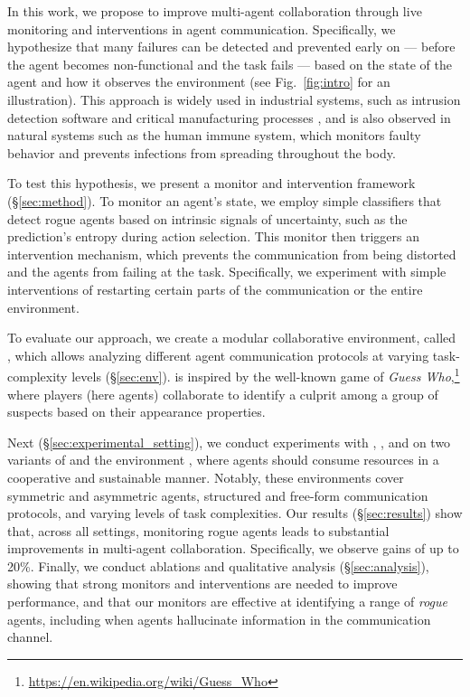 In this work, we propose to improve multi-agent collaboration through live monitoring and interventions in agent communication. Specifically, we hypothesize that many failures can be detected and prevented early on --- before the agent becomes non-functional and the task fails --- based on the state of the agent and how it observes the environment (see Fig.~\ref{fig:intro} for an illustration). 
This approach is widely used in industrial systems, such as intrusion detection software and critical manufacturing processes \cite{STAVROPOULOS2013421, 10.1145/3411763.3451774, manpaper, Woods02092023, cyber}, and is also observed in natural systems such as the human immune system, which monitors faulty behavior and prevents infections from spreading throughout the body. 


To test this hypothesis, we present a monitor and intervention framework (\S\ref{sec:method}). To monitor an agent's state, we employ simple classifiers that detect rogue agents based on intrinsic signals of uncertainty, such as the prediction's entropy during action selection. This monitor then triggers an intervention mechanism, which prevents the communication from being distorted and the agents from failing at the task. 
Specifically, we experiment with simple interventions of restarting certain parts of the communication or the entire environment.

To evaluate our approach, we create a modular collaborative environment, called \ourenv{}, which allows analyzing different agent communication protocols at varying task-complexity levels (\S\ref{sec:env}). \ourenv{} is inspired by the well-known game of \emph{Guess Who},\footnote{\url{https://en.wikipedia.org/wiki/Guess_Who}} where players (here agents) collaborate to identify a culprit among a group of suspects based on their appearance properties.

Next (\S\ref{sec:experimental_setting}), we conduct experiments with \llama{} \cite{grattafiori2024llama3herdmodels}, \qwen{} \cite{qwen2025qwen25technicalreport}, and \gpt{} \cite{openai2024gpt4technicalreport} on two variants of \ourenv{} and the \govsim{} environment \cite{piatti2024cooperate}, where agents should consume resources in a cooperative and sustainable manner. Notably, these environments cover symmetric and asymmetric agents, structured and free-form communication protocols, and varying levels of task complexities.
Our results (\S\ref{sec:results}) show that, across all settings, monitoring rogue agents leads to substantial improvements in multi-agent collaboration. Specifically, we observe gains of up to 20\%.
Finally, we conduct ablations and qualitative analysis (\S\ref{sec:analysis}), showing that strong monitors and interventions are needed to improve performance, and that our monitors are effective at identifying a range of \emph{rogue} agents, including when agents hallucinate information in the communication channel.


